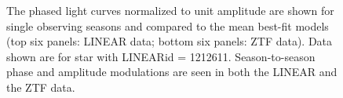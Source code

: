 \begin{figure}[ht]
    \centering
    \caption{The phased light curves normalized to unit amplitude are shown for single observing seasons
      and compared to the mean best-fit models (top six panels: LINEAR data; bottom six panels: ZTF data).
      Data shown are for star with LINEARid = 1212611.
      Season-to-season phase and amplitude modulations are seen in both the LINEAR and the ZTF data.}
      \label{fig:phase4}
\end{figure}



